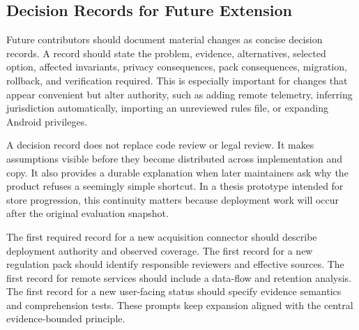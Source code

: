 \subsection{Decision Records for Future Extension}

Future contributors should document material changes as concise decision records. A record should state the problem, evidence, alternatives, selected option, affected invariants, privacy consequences, pack consequences, migration, rollback, and verification required. This is especially important for changes that appear convenient but alter authority, such as adding remote telemetry, inferring jurisdiction automatically, importing an unreviewed rules file, or expanding Android privileges.

A decision record does not replace code review or legal review. It makes assumptions visible before they become distributed across implementation and copy. It also provides a durable explanation when later maintainers ask why the product refuses a seemingly simple shortcut. In a thesis prototype intended for store progression, this continuity matters because deployment work will occur after the original evaluation snapshot.

The first required record for a new acquisition connector should describe deployment authority and observed coverage. The first record for a new regulation pack should identify responsible reviewers and effective sources. The first record for remote services should include a data-flow and retention analysis. The first record for a new user-facing status should specify evidence semantics and comprehension tests. These prompts keep expansion aligned with the central evidence-bounded principle.

